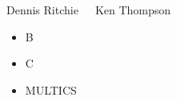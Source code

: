 \documentclass{beamer}
\begin{document}
\begin{frame}
  \begin{columns}

    \begin{block}{Dennis Ritchie}

      \begin{figure}
      \end{figure}

      \begin{itemize}
      \item B
      \item C
      \item MULTICS
      \end{itemize}

    \end{block}


    \begin{block}{Ken Thompson}

      \begin{figure}
      \end{figure}


\end{block}
\end{columns}
\end{frame}
\end{document}
